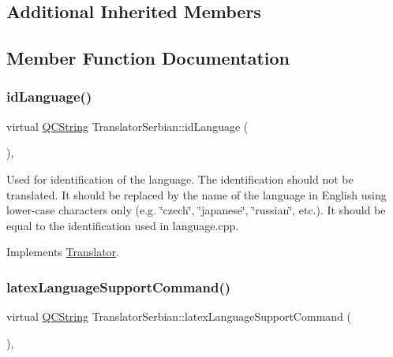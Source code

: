 \subsection*{Additional Inherited Members}


\subsection{Member Function Documentation}
\mbox{\label{class_translator_serbian_a2580f17cd21e0f91bc9775dd0a163ae5}} 
\subsubsection{\texorpdfstring{idLanguage()}{idLanguage()}}
{\footnotesize\ttfamily virtual \mbox{\hyperlink{class_q_c_string}{Q\+C\+String}} Translator\+Serbian\+::id\+Language (\begin{DoxyParamCaption}{ }\end{DoxyParamCaption})\hspace{0.3cm}{\ttfamily [inline]}, {\ttfamily [virtual]}}

Used for identification of the language. The identification should not be translated. It should be replaced by the name of the language in English using lower-\/case characters only (e.\+g. \char`\"{}czech\char`\"{}, \char`\"{}japanese\char`\"{}, \char`\"{}russian\char`\"{}, etc.). It should be equal to the identification used in language.\+cpp. 

Implements \mbox{\hyperlink{class_translator}{Translator}}.

\mbox{\label{class_translator_serbian_a54aa2c09cfa4c090dd27f8c1f7ac8f45}} 
\subsubsection{\texorpdfstring{latexLanguageSupportCommand()}{latexLanguageSupportCommand()}}
{\footnotesize\ttfamily virtual \mbox{\hyperlink{class_q_c_string}{Q\+C\+String}} Translator\+Serbian\+::latex\+Language\+Support\+Command (\begin{DoxyParamCaption}{ }\end{DoxyParamCaption})\hspace{0.3cm}{\ttfamily [inline]}, {\ttfamily [virtual]}}


